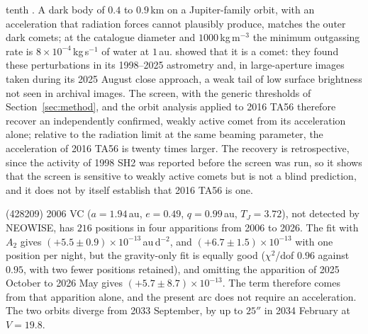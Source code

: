\documentclass[3p,11pt]{elsarticle}
\begin{document}
tenth \citep{Vokrouhlicky2015}. A dark body of $0.4$ to $0.9$\,km on a Jupiter-family
orbit, with an acceleration that radiation forces cannot plausibly produce, matches the
outer dark comets; at the catalogue diameter and $1000$\,kg\,m$^{-3}$ the minimum
outgassing rate is $8\times10^{-4}$\,kg\,s$^{-1}$ of water at $1$\,au. \citet{Farnocchia2026} showed that it is a comet: they found these perturbations in
its 1998--2025 astrometry and, in large-aperture images taken during its 2025 August
close approach, a weak tail of low surface brightness not seen in archival images. The
screen, with the generic thresholds of Section~\ref{sec:method}, and the orbit analysis
applied to 2016 TA56 therefore recover an independently confirmed, weakly active comet
from its acceleration alone; relative to the radiation limit at the same beaming
parameter, the acceleration of 2016 TA56 is twenty times larger. The recovery is
retrospective, since the activity of 1998 SH2 was reported before the screen was run, so
it shows that the screen is sensitive to weakly active comets but is not a blind
prediction, and it does not by itself establish that 2016 TA56 is one.

(428209) 2006 VC ($a=1.94$\,au, $e=0.49$, $q=0.99$\,au, $T_J=3.72$), not detected by
NEOWISE, has $216$ positions in four apparitions from 2006 to 2026. The fit with $A_2$
gives $(+5.5\pm0.9)\times10^{-13}$\,au\,d$^{-2}$, and $(+6.7\pm1.5)\times10^{-13}$ with one
position per night, but the gravity-only fit is equally good ($\chi^2$/dof $0.96$ against
$0.95$, with two fewer positions retained), and omitting the apparition of 2025 October to
2026 May gives $(+5.7\pm8.7)\times10^{-13}$. The term therefore comes from that apparition
alone, and the present arc does not require an acceleration. The two orbits diverge from
2033 September, by up to $25''$ in 2034 February at $V=19.8$.
\end{document}
